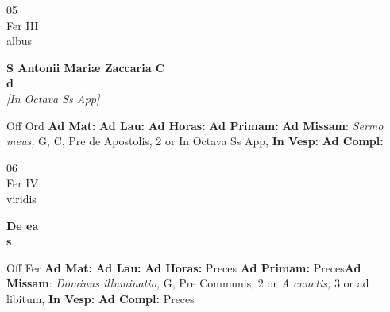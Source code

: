 \documentclass[10pt, openany]{book}
\begin{document}
    \begin{center}
        \begin{minipage}{3.5in}
            \vspace{2em}
            \begin{minipage}{0.5in}
                {\Huge 05} \\
                {\normalsize Fer III} \\
                {\normalsize albus}
            \end{minipage}
            \begin{minipage}{3.0in}
                \textbf{ \large S Antonii Mariæ Zaccaria C \\
                \textnormal{\normalsize d}} \\ \textit{[In Octava Ss App]} \\ 
            \end{minipage}
            \begin{justify}Off Ord
                \textbf{Ad Mat: }
                \textbf{Ad Lau: }
                \textbf{Ad Horas: }
                \textbf{Ad Primam: }\textbf{Ad Missam}: \textit{Sermo meus,} G, C, Pre de Apostolis, 2 or In Octava Ss App,  
                \textbf{In Vesp: }
                \textbf{Ad Compl: }
            \end{justify}
        \end{minipage}
    \end{center}

    \begin{center}
        \begin{minipage}{3.5in}
            \vspace{2em}
            \begin{minipage}{0.5in}
                {\Huge 06} \\
                {\normalsize Fer IV} \\
                {\normalsize viridis}
            \end{minipage}
            \begin{minipage}{3.0in}
                \textbf{ \large De ea \\
                \textnormal{\normalsize s}} \\ 
            \end{minipage}
            \begin{justify}Off Fer
                \textbf{Ad Mat: }
                \textbf{Ad Lau: }
                \textbf{Ad Horas: }Preces
                \textbf{Ad Primam: }Preces\textbf{Ad Missam}: \textit{Dominus illuminatio,} G, Pre Communis, 2 or \textit{A cunctis,} 3 or ad libitum,  
                \textbf{In Vesp: }
                \textbf{Ad Compl: }Preces
            \end{justify}
        \end{minipage}
    \end{center}
\end{document}
